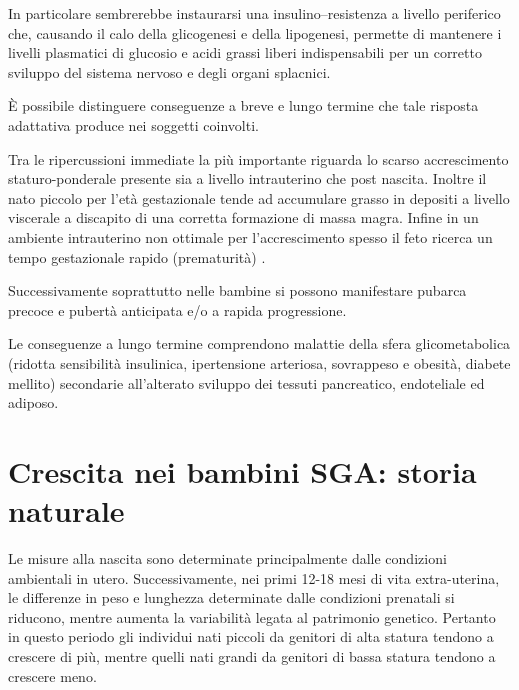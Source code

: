 In particolare sembrerebbe instaurarsi una insulino--resistenza 
a livello periferico che, causando il calo della glicogenesi e della lipogenesi,
permette di mantenere i livelli plasmatici di glucosio e acidi grassi liberi
indispensabili per un corretto sviluppo del sistema nervoso e degli organi splacnici.\cite{sga-51}



\`E possibile distinguere conseguenze a breve e lungo termine che tale risposta
adattativa produce nei soggetti coinvolti.

Tra le ripercussioni immediate la più importante riguarda lo scarso accrescimento
staturo-ponderale presente sia a livello intrauterino che post nascita. Inoltre 
il nato piccolo per l'età gestazionale tende ad accumulare grasso in depositi a livello
viscerale a discapito di una corretta formazione di massa magra. Infine in un ambiente intrauterino non ottimale per l'accrescimento spesso il feto ricerca un tempo gestazionale
rapido (prematurità) \cite{sga-53}. 

Successivamente soprattutto nelle bambine si possono manifestare pubarca precoce e pubertà anticipata e/o a rapida progressione. 

Le conseguenze a lungo termine comprendono malattie della sfera glicometabolica (ridotta sensibilità insulinica,
ipertensione arteriosa, sovrappeso e obesità, diabete mellito) secondarie all'alterato sviluppo dei tessuti pancreatico, endoteliale ed adiposo.\cite{sga-32}


\section{Crescita nei bambini SGA: storia naturale}

Le misure alla nascita sono determinate principalmente dalle condizioni ambientali in utero. Successivamente, nei primi 12-18 mesi di vita extra-uterina, le differenze in peso e lunghezza determinate dalle condizioni prenatali si riducono, mentre aumenta la variabilità legata al patrimonio genetico. Pertanto in questo periodo gli individui nati piccoli da genitori di alta statura tendono a crescere di più, mentre quelli nati grandi da genitori di bassa statura tendono a crescere meno. 


